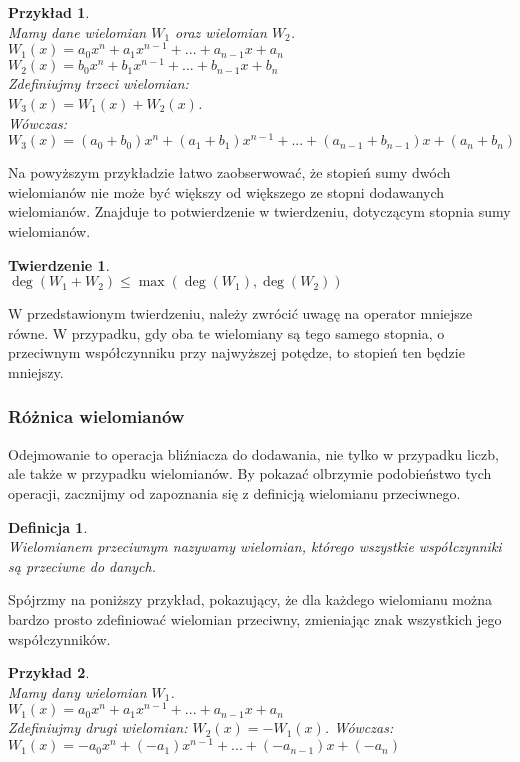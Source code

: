 \documentclass[oneside,a4paper]{book}
\newtheorem{theorem}{Twierdzenie}
\newtheorem{definition}{Definicja}
\newtheorem{example}{Przykład}
\begin{document}
	\begin{example}
		$ $\\
		Mamy dane wielomian $W_1$ oraz wielomian $W_2$. \\
		$W_1(x) = a_0x^n + a_1x^{n-1} + ... + a_{n-1}x + a_n$ \\
		$W_2(x) = b_0x^n + b_1x^{n-1} + ... + b_{n-1}x + b_n$ \\
		Zdefiniujmy trzeci wielomian: \\
		$W_3(x) = W_1(x) + W_2(x)$. \\
		Wówczas: \\
		$W_3(x) = (a_0+b_0)x^n + (a_1+b_1)x^{n-1} + ... + (a_{n-1} + b_{n-1})x + (a_n + b_n)$
	\end{example}
	
	Na powyższym przykładzie łatwo zaobserwować, że stopień sumy dwóch wielomianów nie może być większy od większego ze stopni dodawanych wielomianów. Znajduje to potwierdzenie w twierdzeniu, dotyczącym stopnia sumy wielomianów.
	
	\begin{theorem}
		$ $\\
		$\deg(W_1 + W_2) \le \max(\deg(W_1),\deg (W_2))$
	\end{theorem}
	
	W przedstawionym twierdzeniu, należy zwrócić uwagę na operator mniejsze równe. W przypadku, gdy oba te wielomiany są tego samego stopnia, o przeciwnym współczynniku przy najwyższej potędze, to stopień ten będzie mniejszy.
	
	\subsubsection{Różnica wielomianów}
	
	Odejmowanie to operacja bliźniacza do dodawania, nie tylko w przypadku liczb, ale także w przypadku wielomianów. By pokazać olbrzymie podobieństwo tych operacji, zacznijmy od zapoznania się z definicją wielomianu przeciwnego.
	
	\begin{definition}
		$ $\\
		Wielomianem przeciwnym nazywamy wielomian, którego wszystkie współczynniki są przeciwne do danych.
	\end{definition}
	
	Spójrzmy na poniższy przykład, pokazujący, że dla każdego wielomianu można bardzo prosto zdefiniować wielomian przeciwny, zmieniając znak wszystkich jego współczynników.
	
	\begin{example}
		$ $\\
		Mamy dany wielomian $W_1$. \\
		$W_1(x) = a_0x^n + a_1x^{n-1} + ... + a_{n-1}x + a_n$ \\
		Zdefiniujmy drugi wielomian: $W_2(x) = -W_1(x)$. Wówczas: \\
		$W_1(x) = -a_0x^n + (-a_1)x^{n-1} + ... + (-a_{n-1})x + (-a_n)$
	\end{example}
	
\end{document}

